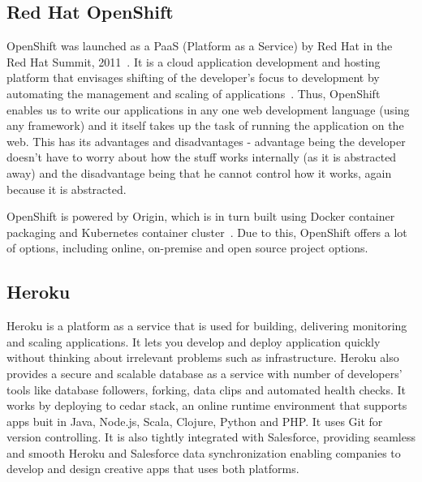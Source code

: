 \subsection{Red Hat OpenShift}

OpenShift was launched as a PaaS (Platform as a Service) by Red Hat in
the Red Hat Summit, 2011~\cite{www-paas-openshift}.  It is a cloud
application development and hosting platform that envisages shifting
of the developer's focus to development by automating the management
and scaling of applications~\cite{www-developers-openshift}.  Thus,
OpenShift enables us to write our applications in any one web
development language (using any framework) and it itself takes up the
task of running the application on the web\cite{www-openshift}.  This
has its advantages and disadvantages - advantage being the developer
doesn't have to worry about how the stuff works internally (as it is
abstracted away) and the disadvantage being that he cannot control how
it works, again because it is abstracted.

OpenShift is powered by Origin, which is in turn built using Docker
container packaging and Kubernetes container
cluster~\cite{www-openshift-blog}.  Due to this, OpenShift offers a
lot of options, including online, on-premise and open source project
options.

    \pv
    
\subsection{Heroku}

    Heroku is a platform as a service that is used
    for building, delivering monitoring and
    scaling applications\cite{www-Heroku}. It
    lets you develop and deploy application quickly without thinking
    about irrelevant problems such as infrastructure. Heroku also
    provides a secure and scalable database as a service with number
    of developers' tools like database followers, forking, data clips
    and automated health checks. It works by deploying to cedar stack,
    an online runtime environment that supports apps buit in Java,
    Node.js, Scala, Clojure, Python and PHP\cite{www-cedar}. It
    uses Git for version controlling. It is also tightly integrated
    with Salesforce, providing seamless and smooth Heroku and
    Salesforce data synchronization enabling companies to develop and
    design creative apps that uses both platforms.

   \pv

